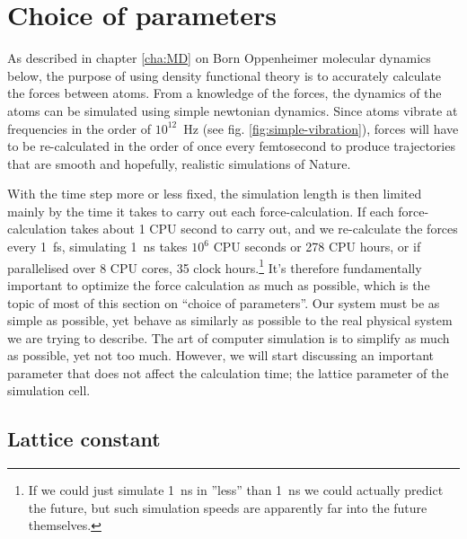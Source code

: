 \documentclass[11pt,bibliography=totoc,index=totoc]{scrbook}   %
\newcommand{\comment}[1]{\hl{#1}}
\begin{document}



%
\section{Choice of parameters}\label{sec:parameters}
%

As described in chapter \ref{cha:MD} on Born Oppenheimer molecular dynamics below, the purpose of using density functional theory is to accurately calculate the forces between atoms. 
From a knowledge of the forces, the dynamics of the atoms can be simulated using simple newtonian dynamics.
Since atoms vibrate at frequencies in the order of $10^{12}$~Hz (see fig. \ref{fig:simple-vibration}), 
forces will have to be re-calculated in the order of once every femtosecond to produce trajectories that are smooth and hopefully, realistic simulations of Nature.

With the time step more or less fixed, the simulation length is then limited mainly by the time it takes to carry out each force-calculation.
If each force-calculation takes about 1 CPU second to carry out, and we re-calculate the forces every 1~fs, simulating 1~ns takes $10^6$ CPU seconds or 278 CPU hours, or if parallelised over 8 CPU cores, 35 clock hours.\footnote{If we could just simulate 1~ns in ''less'' than 1~ns we could actually predict the future, but such simulation speeds are apparently far into the future themselves.}
It's therefore fundamentally important to optimize the force calculation as much as possible, which is the topic of most of this section on ``choice of parameters''.
Our system must be as simple as possible, yet behave as similarly as possible to the real physical system we are trying to describe. 
The art of computer simulation is to simplify as much as possible, yet not too much.
However, we will start discussing an important parameter that does not affect the calculation time; the lattice parameter of the simulation cell.

%
\subsection{Lattice constant}\label{sec:parameters:a}
%
\end{document}
